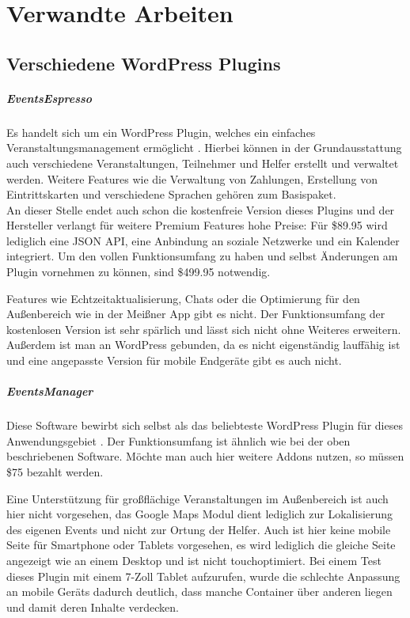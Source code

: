 \chapter{Verwandte Arbeiten}

\section{Verschiedene WordPress Plugins}
\paragraph{EventsEspresso}
Es handelt sich um ein WordPress Plugin, welches ein einfaches Veranstaltungsmanagement ermöglicht \cite{eventespresso}. Hierbei können in der Grundausstattung auch verschiedene Veranstaltungen, Teilnehmer und Helfer erstellt und verwaltet werden. Weitere Features wie die Verwaltung von Zahlungen, Erstellung von Eintrittskarten und verschiedene Sprachen gehören zum Basispaket.\\
An dieser Stelle endet auch schon die kostenfreie Version dieses Plugins und der Hersteller verlangt für weitere Premium Features hohe Preise: Für \$89.95 wird lediglich eine JSON API, eine Anbindung an soziale Netzwerke und ein Kalender integriert. Um den vollen Funktionsumfang zu haben und selbst Änderungen am Plugin vornehmen zu können, sind \$499.95 notwendig.\par

Features wie Echtzeitaktualisierung, Chats oder die Optimierung für den Außenbereich wie in der Meißner App gibt es nicht. Der Funktionsumfang der kostenlosen Version ist sehr spärlich und lässt sich nicht ohne Weiteres erweitern. Außerdem ist man an WordPress gebunden, da es nicht eigenständig lauffähig ist und eine angepasste Version für mobile Endgeräte gibt es auch nicht.

\paragraph{EventsManager}
Diese Software bewirbt sich selbst als das beliebteste WordPress Plugin für dieses Anwendungsgebiet \cite{eventsmanager}. Der Funktionsumfang ist ähnlich wie bei der oben beschriebenen Software. Möchte man auch hier weitere Addons nutzen, so müssen \$75 bezahlt werden.\par

Eine Unterstützung für großflächige Veranstaltungen im Außenbereich ist auch hier nicht vorgesehen, das Google Maps Modul dient lediglich zur Lokalisierung des eigenen Events und nicht zur Ortung der Helfer. Auch ist hier keine mobile Seite für Smartphone oder Tablets vorgesehen, es wird lediglich die gleiche Seite angezeigt wie an einem Desktop und ist nicht touchoptimiert. Bei einem Test dieses Plugin mit einem 7-Zoll Tablet aufzurufen, wurde die schlechte Anpassung an mobile Geräts dadurch deutlich, dass manche Container über anderen liegen und damit deren Inhalte verdecken.

